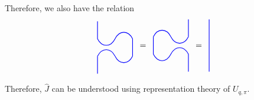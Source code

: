 \documentclass{amsart}
\newcommand{\hackcenter}[1]{
 \xy (0,0)*{#1}; \endxy}
\theoremstyle{plain}
\theoremstyle{definition}
\theoremstyle{definition}
\numberwithin{equation}{section}
\numberwithin{theorem}{section}
\numberwithin{equation}{section}
\let\hat=\widehat
\begin{document}
Therefore, we also have the relation
\begin{align*}
    \hackcenter{ \begin{tikzpicture} [scale=.75]
\draw[thick,   blue] (0,1).. controls ++(.25,-.5) and ++(-.25,-.5).. (1,1);
\draw[thick,   blue] (1,1).. controls ++(.25,.5) and ++(-.25,.5).. (2,1);
%
\draw[thick,   blue] (0,0).. controls ++(.25,.5) and ++(-.25,.5).. (1,0);
\draw[thick,   blue] (1,0).. controls ++(.25,-.5) and ++(-.25,-.5).. (2,0);
%
\draw[thick, blue] (2,0) to (2,1);
\draw[thick, blue] (0,0) to (0,-1);
\draw[thick, blue] (0,1) to (0,2);
\end{tikzpicture}}
\;\;=\;\;
  \hackcenter{ \begin{tikzpicture} [xscale=-1, scale=.75]
\draw[thick,   blue] (0,1).. controls ++(.25,-.5) and ++(-.25,-.5).. (1,1);
\draw[thick,   blue] (1,1).. controls ++(.25,.5) and ++(-.25,.5).. (2,1);
%
\draw[thick,   blue] (0,0).. controls ++(.25,.5) and ++(-.25,.5).. (1,0);
\draw[thick,   blue] (1,0).. controls ++(.25,-.5) and ++(-.25,-.5).. (2,0);
%
\draw[thick, blue] (2,0) to (2,1);
\draw[thick, blue] (0,0) to (0,-1);
\draw[thick, blue] (0,1) to (0,2);
\end{tikzpicture}}
\;\;=\;\;
\hackcenter{ \begin{tikzpicture} [scale=.75]
\draw[thick,   blue] (0,-1) to (0,2);
\end{tikzpicture}}
\end{align*}


Therefore, $\hat{J}$ can be understood using representation theory of $U_{q,\pi}$.
\end{document}
